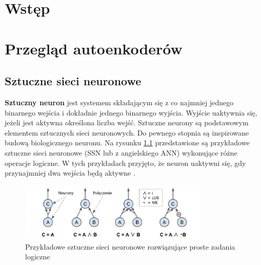 \documentclass[12pt]{mwbk}
\theoremstyle{plain}
\theoremstyle{definition}
\theoremstyle{remark}
\newcommand\zrodlo[1]{\par\vspace{-3mm}{\small\textit{Źródło: }#1 }}
\begin{document}



\tableofcontents


\chapter*{Wstęp}



\chapter{Przegląd autoenkoderów}

\section{Sztuczne sieci neuronowe}

\textbf{Sztuczny neuron} jest systemem składającym się z co najmniej jednego binarnego wejścia i dokładnie jednego binarnego wyjścia. Wyjście uaktywnia się, jeżeli jest aktywna określona liczba wejść. Sztuczne neurony są podstawowym elementem sztucznych sieci neuronowych. Do pewnego stopnia są inspirowane budową biologicznego neuronu. Na rysunku \ref{fig:neurony1} przedstawione są przykładowe sztuczne sieci neuronowe (SSN lub z angielskiego ANN) wykonujące różne operacje logiczne. W tych przykładach przyjęto, że neuron uaktywni się, gdy przynajmniej dwa wejścia będą aktywne \cite{geron}.

\begin{figure}[!h]
	\centering
	\includegraphics[width=9cm]{rys/neurony1.png}
	\caption{Przykładowe sztuczne sieci neuronowe rozwiązujące proste zadania logiczne}
	\zrodlo{\cite{geron}}
	\label{fig:neurony1}
\end{figure}
\end{document}
